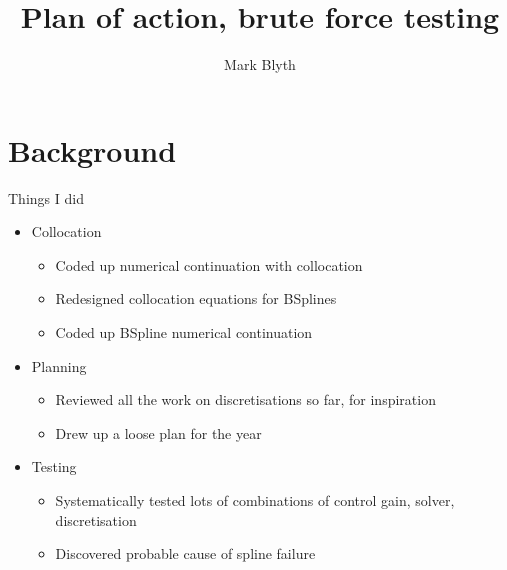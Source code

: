 \documentclass[presentation]{beamer}
\author{Mark Blyth}
\date{}
\title{Plan of action, brute force testing}
\begin{document}
\maketitle

\section{Background}
\label{sec:orgf581752}
\begin{frame}[label={sec:org8d378d7}]{Things I did}
\begin{itemize}
\item Collocation
\begin{itemize}
\item Coded up numerical continuation with collocation
\item Redesigned collocation equations for BSplines
\item Coded up BSpline numerical continuation
\end{itemize}
\end{itemize}
\vfill
\begin{itemize}
\item Planning
\begin{itemize}
\item Reviewed all the work on discretisations so far, for inspiration
\item Drew up a loose plan for the year
\end{itemize}
\end{itemize}
\vfill
\begin{itemize}
\item Testing
\begin{itemize}
\item Systematically tested lots of combinations of control gain, solver, discretisation
\item Discovered probable cause of spline failure
\end{itemize}
\end{itemize}
\end{frame}
\end{document}
